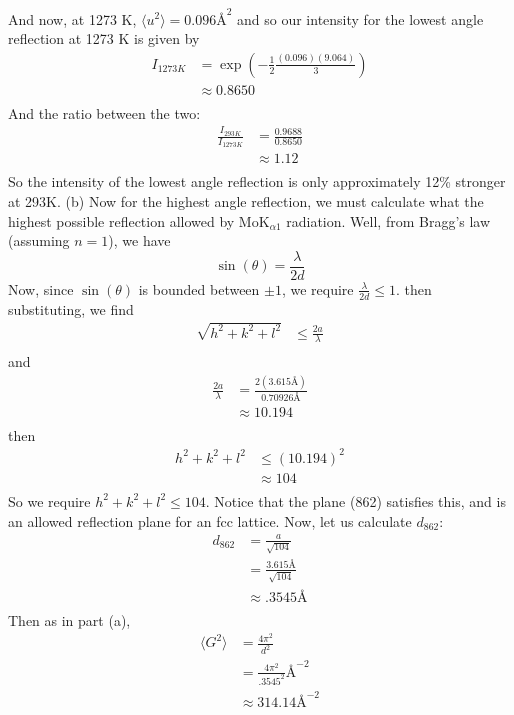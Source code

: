 \documentclass{article}
\begin{document}
And now, at 1273 K, $\langle u^2 \rangle = 0.096 \text{\AA}^2$ and so our intensity for the lowest angle reflection at 1273 K is given by
\begin{align*}
    I_{1273K} &= \exp{\left(-\frac{1}{2}\frac{(0.096)(9.064)}{3}\right)} \\
    &\approx 0.8650 \\
\end{align*}
And the ratio between the two:
\begin{align*}
    \frac{I_{293K}}{I_{1273K}} &= \frac{0.9688}{0.8650} \\
    &\approx 1.12 \\
\end{align*}
So the intensity of the lowest angle reflection is only approximately 12\% stronger at 293K. 
\newline
(b) Now for the highest angle reflection, we must calculate what the highest possible reflection allowed by Mo$\text{K}_{\alpha 1}$ radiation. Well, from Bragg's law (assuming $n = 1$), we have
\[\sin{(\theta)} = \frac{\lambda}{2d}\]
Now, since $\sin{(\theta)}$ is bounded between $\pm 1$, we require $\frac{\lambda}{2d} \leq 1$. then substituting, we find
\begin{align*}
    \sqrt{h^2 + k^2 + l^2} &\leq \frac{2a}{\lambda} \\
\end{align*}
and 
\begin{align*}
    \frac{2a}{\lambda} &= \frac{2(3.615 \text{\AA})}{0.70926 \text{\AA}} \\
    &\approx 10.194 \\
\end{align*}
then
\begin{align*}
    h^2 + k^2 + l^2 &\leq (10.194)^2 \\
    &\approx 104 \\
\end{align*}
So we require $h^2 + k^2 + l^2 \leq 104$. Notice that the plane (862) satisfies this, and is an allowed reflection plane for an fcc lattice. Now, let us calculate $d_{862}$:
\begin{align*}
    d_{862} &= \frac{a}{\sqrt{104}} \\
    &= \frac{3.615 \text{\AA}}{\sqrt{104}} \\
    &\approx .3545 \text{\AA}\\
\end{align*}
Then as in part (a), 
\begin{align*}
    \langle G^2 \rangle &= \frac{4 \pi^2}{d^2} \\
    &= \frac{4 \pi^2}{.3545^2} \text{\AA}^{-2} \\
    &\approx 314.14 \text{\AA}^{-2} \\
\end{align*}
\end{document}

